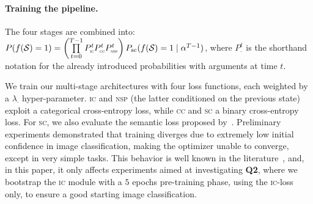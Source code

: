 \paragraph{Training the pipeline.}
The four stages are combined into: %
$    P(f(\mathcal{S}) = 1) =  \left( \prod\limits_{t=0}^{T-1} P^t_{\text{\sc\tiny ic}} P^t_{\text{\sc\tiny cc}} P^t_{\text{\sc\tiny nsp}} \right) P_{\text{sc}}(f(\mathcal{S}) = 1 \mid \alpha^{T-1})$,
where $P^t_{\cdot}$ is the shorthand notation for the already introduced probabilities with arguments at time $t$.

We train our multi-stage architectures with four loss functions, each weighted by a $\lambda_{\cdot}$ hyper-parameter. \textsc{ic} and \textsc{nsp} (the latter conditioned on the previous state) exploit a %
categorical cross-entropy loss, %
while \textsc{cc} and \textsc{sc} %
a binary cross-entropy loss. %
For \textsc{sc}, we also evaluate the semantic loss proposed by~\cite{umili2023grounding}.
Preliminary experiments demonstrated that training diverges due to extremely low initial confidence in image classification,%
making the optimizer unable to converge, except in very simple tasks. This behavior is well known in the literature~\cite{manhaeve2021approximate,van2024independence,maene2024hardness}, and, in this paper, it only affects experiments aimed at investigating \textbf{Q2}, where we bootstrap the  \textsc{ic} module with a $5$ epochs pre-training phase, using the \textsc{ic}-loss only, %
to ensure a good starting image classification. %
\fi


